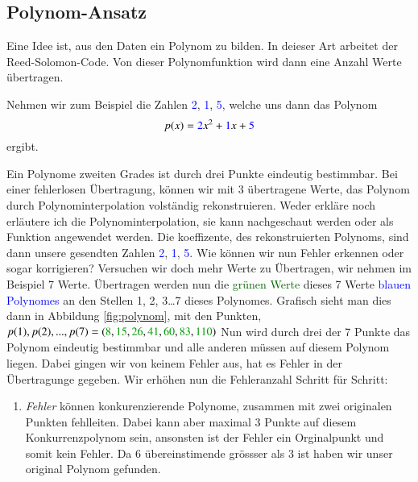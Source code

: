 \subsection{Polynom-Ansatz
\label{reedsolomon:section:polynomansatz}}
Eine Idee ist, aus den Daten ein Polynom zu bilden. 
In deieser Art arbeitet der Reed-Solomon-Code.
Von dieser Polynomfunktion wird dann eine Anzahl Werte übertragen.
\begin{beispiel} Nehmen wir zum Beispiel die Zahlen \textcolor{blue}{2}, \textcolor{blue}{1}, \textcolor{blue}{5},
    welche uns dann das Polynom 
\begin{equation}
p(x)
=
\textcolor{blue}{2}x^2 + \textcolor{blue}{1}x + \textcolor{blue}{5}
\label{reedsolomon:equation1}
\end{equation}
ergibt.
\par 
Ein Polynome zweiten Grades ist durch drei Punkte eindeutig bestimmbar. 
Bei einer fehlerlosen Übertragung, können wir mit 3 übertragene Werte,
    das Polynom durch Polynominterpolation volständig rekonstruieren.
Weder erkläre noch erläutere ich die Polynominterpolation, 
    sie kann nachgeschaut werden oder als Funktion angewendet werden.
Die koeffizente, des rekonstruierten Polynoms, sind dann unsere gesendten Zahlen \textcolor{blue}{2}, \textcolor{blue}{1}, \textcolor{blue}{5}.
Wie können wir nun Fehler erkennen oder sogar korrigieren?
Versuchen wir doch mehr Werte zu Übertragen, wir nehmen im Beispiel 7 Werte.
Übertragen werden nun die \textcolor{darkgreen}{grünen Werte} 
    dieses 7 Werte \textcolor{blue}{blauen Polynomes} an den Stellen 1, 2, 3\dots 7 dieses Polynomes.
Grafisch sieht man dies dann in Abbildung \ref{fig:polynom}, 
    mit den Punkten, $p(1),p(2),...,p(7) = (\textcolor{darkgreen}{8}, 
    \textcolor{darkgreen}{15}, \textcolor{darkgreen}{26},
    \textcolor{darkgreen}{41}, \textcolor{darkgreen}{60}, 
    \textcolor{darkgreen}{83}, \textcolor{darkgreen}{110})$
Nun wird durch drei der 7 Punkte das Polynom eindeutig bestimmbar und 
    alle anderen müssen auf diesem Polynom liegen.
Dabei gingen wir von keinem Fehler aus,
    hat es Fehler in der Übertragunge gegeben.
Wir erhöhen nun die Fehleranzahl Schritt für Schritt:
\begin{enumerate}
    \item \textit{Fehler} können konkurenzierende Polynome, zusammen mit zwei originalen Punkten fehlleiten.
        Dabei kann aber maximal 3 Punkte auf diesem Konkurrenzpolynom sein, 
        ansonsten ist der Fehler ein Orginalpunkt und somit kein Fehler.
        Da 6 übereinstimende grössser als 3 ist haben wir unser original Polynom gefunden.

\end{enumerate}
\end{beispiel}
